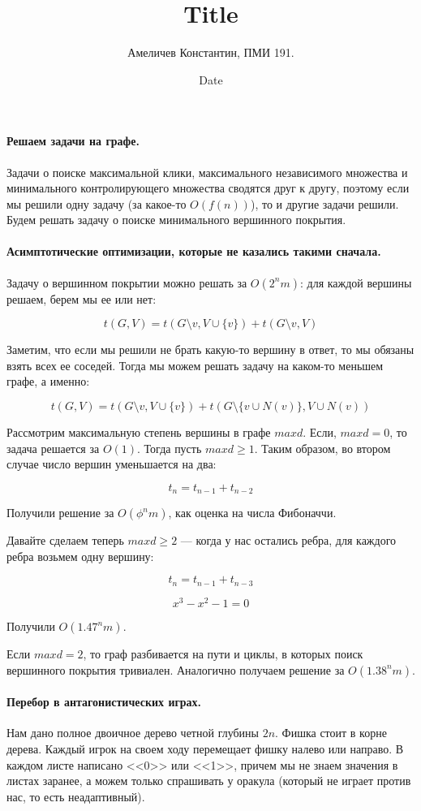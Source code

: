 \documentclass[12pt]{article}
\title{Title}
\author{Амеличев Константин, ПМИ 191.}
\date{Date}
\begin{document}
\paragraph{Решаем задачи на графе.} Задачи о поиске максимальной клики, максимального независимого множества и минимального контролирующего множества сводятся друг к другу, поэтому если мы решили одну задачу (за какое-то $O(f(n))$), то и другие задачи решили. Будем решать задачу о поиске минимального вершинного покрытия.

\paragraph{Асимптотические оптимизации, которые не казались такими сначала.} Задачу о вершинном покрытии можно решать за $O(2^n m)$: для каждой вершины решаем, берем мы ее или нет:

$$t(G, V) = t(G \setminus v, V \cup \{v\}) + t(G \setminus v, V)$$

Заметим, что если мы решили не брать какую-то вершину в ответ, то мы обязаны взять всех ее соседей. Тогда мы можем решать задачу на каком-то меньшем графе, а именно:

$$t(G, V) = t(G \setminus v, V \cup \{v\}) + t(G \setminus \{v \cup N(v)\}, V \cup N(v))$$

Рассмотрим максимальную степень вершины в графе $maxd$. Если, $maxd = 0$, то задача решается за $O(1)$. Тогда пусть $maxd \ge 1$. Таким образом, во втором случае число вершин уменьшается на два:

$$t_n = t_{n - 1} + t_{n - 2}$$

Получили решение за $O(\phi^n m)$, как оценка на числа Фибоначчи.

Давайте сделаем теперь $maxd \ge 2$ --- когда у нас остались ребра, для каждого ребра возьмем одну вершину:

$$t_n = t_{n - 1} + t_{n - 3}$$

$$x^3 - x^2 - 1 = 0$$

Получили $O(1.47^n m)$.

Если $maxd = 2$, то граф разбивается на пути и циклы, в которых поиск вершинного покрытия тривиален. Аналогично получаем решение за $O(1.38^n m)$.

\paragraph{Перебор в антагонистических играх.} Нам дано полное двоичное дерево четной глубины $2n$. Фишка стоит в корне дерева. Каждый игрок на своем ходу перемещает фишку налево или направо. В каждом листе написано <<0>> или <<1>>, причем мы не знаем значения в листах заранее, а можем только спрашивать у оракула (который не играет против нас, то есть неадаптивный).
\end{document}
